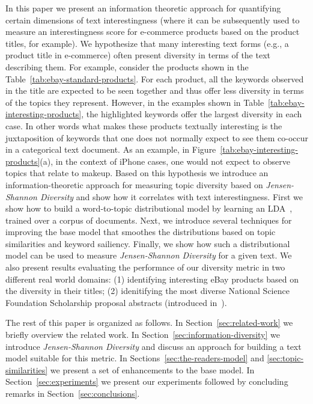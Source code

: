 In this paper we present an information theoretic approach for quantifying certain dimensions of text interestingness (where it can be subsequently used to measure an interestingness score for e-commerce products based on the product titles, for example). We hypothesize that many interesting text forms (e.g., a product title in e-commerce) often present diversity in terms of the text describing them. For example, consider the products shown in the Table~\ref{tab:ebay-standard-products}. For each product, all the keywords observed in the title are expected to be seen together and thus offer less diversity in terms of the topics they represent. However, in the examples shown in Table~\ref{tab:ebay-interesting-products}, the highlighted keywords offer the largest diversity in each case. In other words what makes these products textually interesting is the juxtaposition of keywords that one does not normally expect to see them co-occur in a categorical text document. As an example, in Figure~\ref{tab:ebay-interesting-products}(a), in the context of iPhone cases, one would not expect to observe topics that relate to makeup. Based on this hypothesis we introduce an information-theoretic approach for measuring topic diversity based on {\em Jensen-Shannon Diversity} and show how it correlates with text interestingness. First we show how to build a word-to-topic distributional model by learning an LDA~\cite{Blei:2003:LDA:944919.944937}, trained over a corpus of documents. Next, we introduce several techniques for improving the base model that smoothes the distributions based on topic similarities and keyword sailiency. Finally, we show how such a distributional model can be used to measure {\em Jensen-Shannon Diversity} for a given text. We also present results evaluating the performnce of our diversity metric in two different real world domains: (1) identifying interesting eBay products based on the diversity in their titles; (2) idenitifying the most diverse National Science Foundation Scholarship proposal abstracts (introduced in~\cite{bache:2013}). 

The rest of this paper is organized as follows. In Section~\ref{sec:related-work} we briefly overview the related work. In Section~\ref{sec:information-diversity} we introduce {\em Jensen-Shannon Diversity} and discuss an approach for building a text model suitable for this metric. In Sections~\ref{sec:the-readers-model} and \ref{sec:topic-similarities} we present a set of enhancements to the base model. In Section~\ref{sec:experiments} we present our experiments followed by concluding remarks in Section~\ref{sec:conclusions}.


